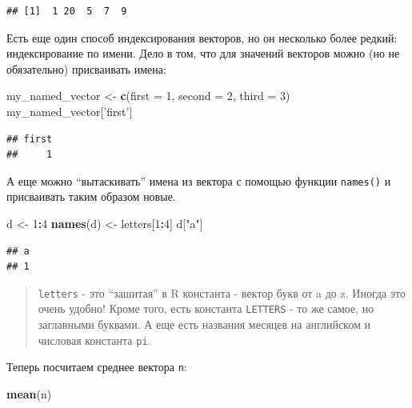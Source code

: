 \documentclass[]{book}
\newenvironment{Shaded}{\begin{snugshade}}{\end{snugshade}}
\newcommand{\DataTypeTok}[1]{\textcolor[rgb]{0.13,0.29,0.53}{#1}}
\newcommand{\DecValTok}[1]{\textcolor[rgb]{0.00,0.00,0.81}{#1}}
\newcommand{\KeywordTok}[1]{\textcolor[rgb]{0.13,0.29,0.53}{\textbf{#1}}}
\newcommand{\NormalTok}[1]{#1}
\newcommand{\OperatorTok}[1]{\textcolor[rgb]{0.81,0.36,0.00}{\textbf{#1}}}
\newcommand{\StringTok}[1]{\textcolor[rgb]{0.31,0.60,0.02}{#1}}
\begin{document}
\begin{verbatim}
## [1]  1 20  5  7  9
\end{verbatim}

Есть еще один способ индексирования векторов, но он несколько более редкий: индексирование по имени. Дело в том, что для значений векторов можно (но не обязательно) присваивать имена:

\begin{Shaded}
\begin{Highlighting}[]
\NormalTok{my_named_vector <-}\StringTok{ }\KeywordTok{c}\NormalTok{(}\DataTypeTok{first =} \DecValTok{1}\NormalTok{, }\DataTypeTok{second =} \DecValTok{2}\NormalTok{, }\DataTypeTok{third =} \DecValTok{3}\NormalTok{)}
\NormalTok{my_named_vector[}\StringTok{'first'}\NormalTok{]}
\end{Highlighting}
\end{Shaded}

\begin{verbatim}
## first 
##     1
\end{verbatim}

А еще можно ``вытаскивать'' имена из вектора с помощью функции \texttt{names()} и присваивать таким образом новые.

\begin{Shaded}
\begin{Highlighting}[]
\NormalTok{d <-}\StringTok{ }\DecValTok{1}\OperatorTok{:}\DecValTok{4}
\KeywordTok{names}\NormalTok{(d) <-}\StringTok{ }\NormalTok{letters[}\DecValTok{1}\OperatorTok{:}\DecValTok{4}\NormalTok{]}
\NormalTok{d[}\StringTok{"a"}\NormalTok{]}
\end{Highlighting}
\end{Shaded}

\begin{verbatim}
## a 
## 1
\end{verbatim}

\begin{quote}
\texttt{letters} - это ``зашитая'' в R константа - вектор букв от a до z. Иногда это очень удобно! Кроме того, есть константа \texttt{LETTERS} - то же самое, но заглавными буквами. А еще есть названия месяцев на английском и числовая константа \texttt{pi}.
\end{quote}

Теперь посчитаем среднее вектора \texttt{n}:

\begin{Shaded}
\begin{Highlighting}[]
\KeywordTok{mean}\NormalTok{(n)}
\end{Highlighting}
\end{Shaded}
\end{document}
